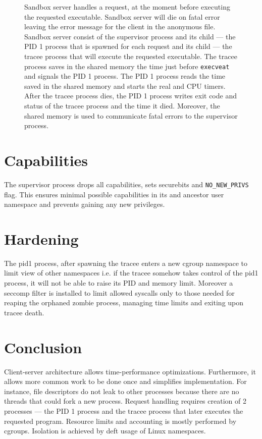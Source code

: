 \documentclass[en]{pracamgr}
\begin{document}
\begin{figure}[h]
\begin{tikzpicture}[align=center]
\end{tikzpicture}
\caption{Sandbox server handles a request, at the moment before executing the requested executable. Sandbox server will die on fatal error leaving the error message for the client in the anonymous file. Sandbox server consist of the supervisor process and its child --- the PID 1 process that is spawned for each request and its child --- the tracee process that will execute the requested executable. The tracee process saves in the shared memory the time just before \texttt{execveat} and signals the PID 1 process. The PID 1 process reads the time saved in the shared memory and starts the real and CPU timers. After the tracee process dies, the PID 1 process writes exit code and status of the tracee process and the time it died. Moreover, the shared memory is used to communicate fatal errors to the supervisor process.}
\label{fig:server_handles_request_before_execveat}
\end{figure}

\section{Capabilities}

The supervisor process drops all capabilities, sets securebits and \texttt{NO\_NEW\_PRIVS} flag. This ensures minimal possible capabilities in its and ancestor user namespace and prevents gaining any new privileges.

\section{Hardening}

The pid1 process, after spawning the tracee enters a new cgroup namespace to limit view of other namespaces i.e. if the tracee somehow takes control of the pid1 process, it will not be able to raise its PID and memory limit. Moreover a seccomp filter is installed to limit allowed syscalls only to those needed for reaping the orphaned zombie process, managing time limits and exiting upon tracee death.

\section{Conclusion}

Client-server architecture allows time-performance optimizations. Furthermore, it allows more common work to be done once and simplifies implementation. For instance, file descriptors do not leak to other processes because there are no threads that could fork a new process. Request handling requires creation of 2 processes --- the PID 1 process and the tracee process that later executes the requested program. Resource limits and accounting is mostly performed by cgroups. Isolation is achieved by deft usage of Linux namespaces.
\end{document}
